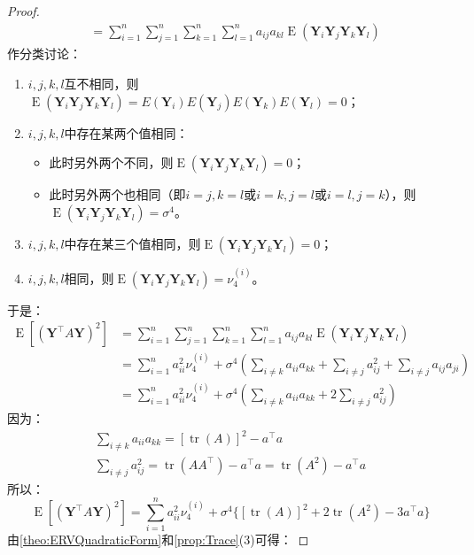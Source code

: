 \begin{proof}
\begin{align*}
		&=\sum_{i=1}^{n}\sum_{j=1}^{n}\sum_{k=1}^{n}\sum_{l=1}^{n}a_{ij}a_{kl}\operatorname{E}(\mathbf{Y}_i\mathbf{Y}_j\mathbf{Y}_k\mathbf{Y}_l)
	\end{align*}
	作分类讨论：
	\begin{enumerate}
		\item $i,j,k,l$互不相同，则$\operatorname{E}(\mathbf{Y}_i\mathbf{Y}_j\mathbf{Y}_k\mathbf{Y}_l)=E(\mathbf{Y}_i)E(\mathbf{Y}_j)E(\mathbf{Y}_k)E(\mathbf{Y}_l)=0$；
		\item $i,j,k,l$中存在某两个值相同：
		\begin{itemize}
			\item 此时另外两个不同，则$\operatorname{E}(\mathbf{Y}_i\mathbf{Y}_j\mathbf{Y}_k\mathbf{Y}_l)=0$；
			\item 此时另外两个也相同（即$i=j,k=l$或$i=k,j=l$或$i=l,j=k$），则$\operatorname{E}(\mathbf{Y}_i\mathbf{Y}_j\mathbf{Y}_k\mathbf{Y}_l)=\sigma^4$。
		\end{itemize}
		\item $i,j,k,l$中存在某三个值相同，则$\operatorname{E}(\mathbf{Y}_i\mathbf{Y}_j\mathbf{Y}_k\mathbf{Y}_l)=0$；
		\item $i,j,k,l$相同，则$\operatorname{E}(\mathbf{Y}_i\mathbf{Y}_j\mathbf{Y}_k\mathbf{Y}_l)=\nu_4^{(i)}$。
	\end{enumerate}
	于是：
	\begin{align*}
		\operatorname{E}[(\mathbf{Y}^{\top}A\mathbf{Y})^2]
		&=\sum_{i=1}^{n}\sum_{j=1}^{n}\sum_{k=1}^{n}\sum_{l=1}^{n}a_{ij}a_{kl}\operatorname{E}(\mathbf{Y}_i\mathbf{Y}_j\mathbf{Y}_k\mathbf{Y}_l) \\
		&=\sum_{i=1}^{n}a_{ii}^2\nu_4^{(i)}+\sigma^4\left(\sum_{i\ne k}a_{ii}a_{kk}+\sum_{i\ne j}a_{ij}^2+\sum_{i\ne j}a_{ij}a_{ji}\right) \\
		&=\sum_{i=1}^{n}a_{ii}^2\nu_4^{(i)}+\sigma^4\left(\sum_{i\ne k}a_{ii}a_{kk}+2\sum_{i\ne j}a_{ij}^2\right)
	\end{align*}
	因为：
	\begin{gather*}
		\sum_{i\ne k}a_{ii}a_{kk}=[\operatorname{tr}(A)]^2-a^{\top}a \\
		\sum_{i\ne j}a_{ij}^2=\operatorname{tr}(AA^{\top})-a^{\top}a=\operatorname{tr}(A^2)-a^{\top}a
	\end{gather*}
	所以：
	\begin{equation*}
		\operatorname{E}[(\mathbf{Y}^{\top}A\mathbf{Y})^2]=\sum_{i=1}^{n}a_{ii}^2\nu_4^{(i)}+\sigma^4\{[\operatorname{tr}(A)]^2+2\operatorname{tr}(A^2)-3a^{\top}a\}
	\end{equation*}
	由\cref{theo:ERVQuadraticForm}和\cref{prop:Trace}(3)可得：

\end{proof}
